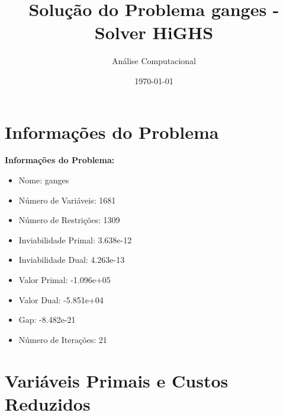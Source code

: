 \documentclass[12pt]{article}
\title{Solução do Problema ganges - Solver HiGHS}
\author{Análise Computacional}
\date{\today}
\begin{document}
\maketitle

\section{Informações do Problema}

\textbf{Informações do Problema:}
\begin{itemize}
\item Nome: ganges
\item Número de Variáveis: 1681
\item Número de Restrições: 1309
\item Inviabilidade Primal: 3.638e-12
\item Inviabilidade Dual: 4.263e-13
\item Valor Primal: -1.096e+05
\item Valor Dual: -5.851e+04
\item Gap: -8.482e-21
\item Número de Iterações: 21
\end{itemize}


\section{Variáveis Primais e Custos Reduzidos}
\end{document}

